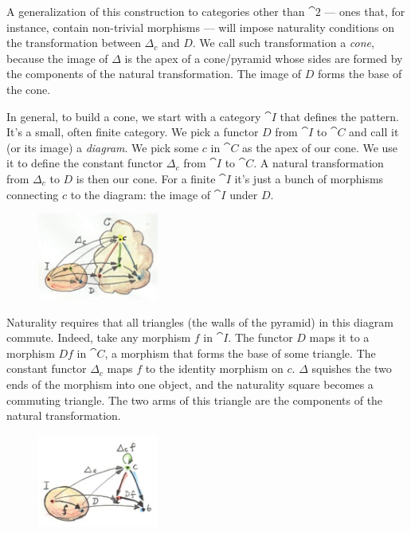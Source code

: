 \noindent
A generalization of this construction to categories other than
$\cat{2}$ --- ones that, for instance, contain non-trivial morphisms
--- will impose naturality conditions on the transformation between
$\Delta_c$ and $D$. We call such transformation a \emph{cone},
because the image of $\Delta$ is the apex of a cone/pyramid whose sides are
formed by the components of the natural transformation. The image of $D$
forms the base of the cone.

In general, to build a cone, we start with a category $\cat{I}$ that
defines the pattern. It's a small, often finite category. We pick a
functor $D$ from $\cat{I}$ to $\cat{C}$ and call it (or its image) a
\emph{diagram}. We pick some $c$ in $\cat{C}$ as the apex of our
cone. We use it to define the constant functor $\Delta_c$ from
$\cat{I}$ to $\cat{C}$. A natural transformation from $\Delta_c$
to $D$ is then our cone. For a finite $\cat{I}$ it's just a bunch of
morphisms connecting $c$ to the diagram: the image of $\cat{I}$
under $D$.

\begin{figure}[H]
\centering
\includegraphics[width=1.56250in]{images/cone.jpg}
\end{figure}

\noindent
Naturality requires that all triangles (the walls of the pyramid) in
this diagram commute. Indeed, take any morphism $f$ in $\cat{I}$.
The functor $D$ maps it to a morphism $D f$ in $\cat{C}$, a
morphism that forms the base of some triangle. The constant functor
$\Delta_c$ maps $f$ to the identity morphism on
$c$. $\Delta$ squishes the two ends of the morphism into one object, and
the naturality square becomes a commuting triangle. The two arms of this
triangle are the components of the natural transformation.

\begin{figure}[H]
\centering
\includegraphics[width=1.56250in]{images/conenaturality.jpg}
\end{figure}

